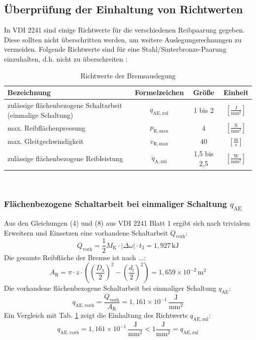 \subsection{Überprüfung der Einhaltung von Richtwerten}
In VDI 2241 \cite[Tab. 2]{VDI2241-2} sind einige Richtwerte für die verschiedenen Reibpaarung gegeben. Diese sollten nicht überschritten werden, um weitere Auslegungsrechnungen zu vermeiden. 
Folgende Richtwerte sind für eine Stahl/Sinterbronze-Paarung einzuhalten, d.h. nicht zu überschreiten \cite[S. 5, Tab. 2]{VDI2241-2}:
\begin{table}[H]
    \centering
    \caption{Richtwerte der Bremsauslegung}
    \begin{tabular}{p{8cm}ccc}
        \toprule
         Bezeichnung&  Formelzeichen& Größe& Einheit\\
         \midrule
         zulässige flächenbezogene Schaltarbeit (einmalige Schaltung)& $q_\mathrm{AE,zul}$& 1 bis 2& $[\mathrm{\frac{J}{mm^2}}]$\\
         max. Reibflächenpressung& $p_\mathrm{R,max}$& $4$& $[\mathrm{\frac{N}{mm^2}}]$\\
         max. Gleitgechwindigkeit& $v_\mathrm{R,max}$& $40$& $[\mathrm{\frac{m}{s}}]$ \\
         zulässige flächenbezogene Reibleistung& $\dot{q}_\mathrm{A,zul}$& 1,5 bis 2,5& $[\mathrm{\frac{W}{mm^2}}]$ \\
         \bottomrule
    \end{tabular}
    \label{Brumse_Richt}
\end{table}\\


\subsubsection{Flächenbezogene Schaltarbeit bei einmaliger Schaltung $q_\mathrm{AE}$} \label{Sec_qAE}
Aus den Gleichungen (4) und (8) aus VDI 2241 Blatt 1 \cite[S. 15]{VDI2241-1} ergibt sich nach trivialem Erweitern und Einsetzen eine vorhandene Schaltarbeit $Q_\mathrm{vorh}$: 
\begin{equation}
    Q_\mathrm{vorh} = \frac{1}{2} M_\mathrm{K} \cdot |\Delta \omega| \cdot t_3 =  1,927\,\mathrm{kJ}
\end{equation}
Die gesamte Reibfläche der Bremse ist nach ...:
\begin{equation}
    A_\mathrm{R} = \pi \cdot z \cdot \left( \left(\frac{D_\mathrm{a}}{2}\right)^2 - \left(\frac{d_\mathrm{i}}{2}\right)^2 \right) = 1,659\times10^{-2}\,\mathrm{m^2}
\end{equation} 
Die vorhandene flächenbezogene Schaltarbeit bei einmaliger Schaltung $q_\mathrm{AE}$:
\begin{equation}
    q_\mathrm{AE,vorh} = \frac{Q_\mathrm{vorh}}{A_\mathrm{R}} = 1,161\times 10^{-1}\,\mathrm{\frac{J}{mm^2}}
\end{equation}
Ein Vergleich mit Tab. \ref{Brumse_Richt} zeigt die Einhaltung des Richtwerts $q_\mathrm{AE,zul}$:
\begin{equation}
    q_\mathrm{AE,vorh} = 1,161\times10^{-1}\,\mathrm{\frac{J}{mm^2}} <  1\mathrm{\frac{J}{mm^2}} = q_\mathrm{AE,zul}
\end{equation}

